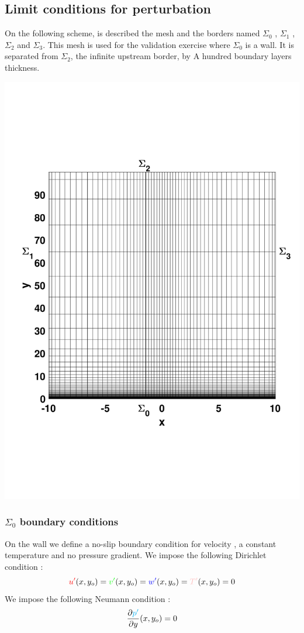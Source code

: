 \documentclass[ border=0pt, a4paper, 11pt]{article}
\numberwithin{equation}{section}
\numberwithin{equation}{section}
\renewcommand{\u}{\textcolor{red}{u'}}
\renewcommand{\v}{\textcolor{green}{v'}}
\newcommand{\w}{\textcolor{blue}{w'}}
\newcommand{\p}{\textcolor{cyan}{p'}}
\newcommand{\T}{\textcolor{pink}{T'}}
\begin{document}
\subsection{Limit conditions for perturbation }
On the following scheme, is described the mesh and the borders named $\Sigma_{0}$ , $\Sigma_{1}$ , $\Sigma_{2}$ and $\Sigma_{3}$. This mesh is used for the validation exercise where $\Sigma_{0}$ is a wall. It is separated from $\Sigma_{2}$, the infinite upstream border, by A hundred boundary layers thickness. 

\begin{center}
   \includegraphics[scale=0.4]{mesh.pdf} 
\end{center}

\subsubsection{$\Sigma_{0}$ boundary conditions}
On the wall we define a no-slip boundary condition for velocity , a constant temperature and no pressure gradient. We impose the following Dirichlet condition : $$ \u (x,y_{o}) =\v (x,y_{o})=\w (x,y_{o})=\T (x,y_{o})=0 $$
We impose the following Neumann condition : $$ \frac{\partial \p}{\partial y} (x,y_{o}) =0 $$
\end{document}
